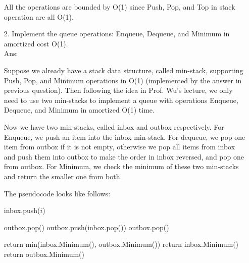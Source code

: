 \begin{enumerate}
All the operations are bounded by O(1) since Push, Pop, and Top in stack operation are all O(1).

\item [2.] Implement the queue operations: Enqueue, Dequeue, and Minimum in amortized cost O(1). \\
Ans:

Suppose we already have a stack data structure, called min-stack, supporting Push, Pop, and Minimum operations in O(1) (implemented by the answer in previous question).  Then following the idea in Prof. Wu's lecture, we only need to use two min-stacks to implement a queue with operations Enqueue, Dequeue, and Minimum in amortized O(1) time.

Now we have two min-stacks, called inbox and outbox respectively.  For Enqueue, we push an item into the inbox min-stack.  For dequeue, we pop one item from outbox if it is not empty, otherwise we pop all items from inbox and push them into outbox to make the order in inbox reversed, and pop one from outbox.  For Minimum, we check the minimum of these two min-stacks and return the smaller one from both.

The pseudocode looks like follows:

\begin{algorithmic}[0]
    \State inbox.push($i$) 
\EndProcedure
\end{algorithmic}


\begin{algorithmic}[0]
        \State outbox.pop() 
    \Else
            \State outbox.push(inbox.pop()) 
        \EndWhile
        \State outbox.pop() 
    \EndIf
\EndProcedure
\end{algorithmic}


\begin{algorithmic}[0]
        \State return min(inbox.Minimum(), outbox.Minimum()) 
        \State return inbox.Minimum() 
        \State return outbox.Minimum() 
    \EndIf
\EndProcedure
\end{algorithmic}


\end{enumerate}
